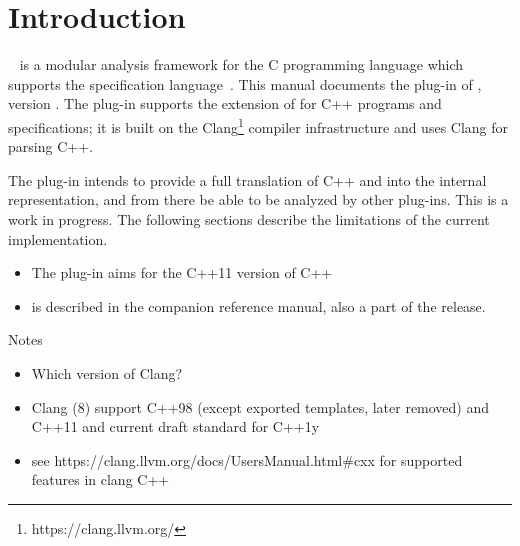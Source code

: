 \chapter{Introduction}

\framac~\cite{userman,fac15} is a modular analysis framework for the C
programming language which supports the \acsl specification
language~\cite{acsl}. This manual documents the \fclang plug-in of \framac,
version \fclangversion. 
The \fclang plug-in supports the \acslpp extension of \acsl for C++ programs and specifications; 
it is built on the Clang\footnote{https://clang.llvm.org/} compiler infrastructure and uses Clang for 
parsing C++.

The \fclang plug-in intends to provide a full translation of C++ and \acslpp into the \framac internal representation, and from there be able to be analyzed by other \framac plug-ins. 
This is a work in progress. 
The following sections describe the  limitations of the current implementation.
\begin{itemize}
	\item The plug-in aims for the C++11 version of C++
	\item \acslpp is described in the companion \acslpp reference manual, also a part of the \framac release.
\end{itemize}


Notes
\begin{itemize}
	\item Which version of Clang?
	\item Clang (8) support C++98 (except exported templates, later removed) and C++11 and current draft standard for C++1y 
	\item see https://clang.llvm.org/docs/UsersManual.html\#cxx for supported features in clang C++
\end{itemize}




